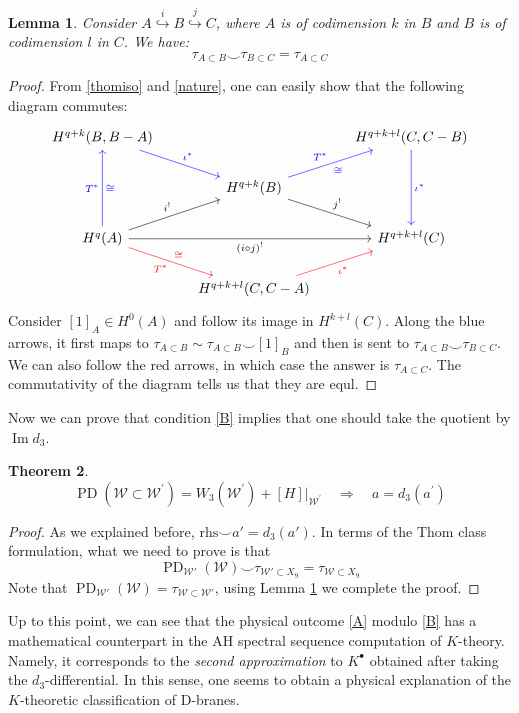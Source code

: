 \documentclass[a4paper,11pt]{article}
\newtheorem{theorem}{Theorem}[section]
\newtheorem{lemma}[theorem]{Lemma}
\theoremstyle{definition}
\theoremstyle{remark}
\begin{document}
\begin{lemma}
	\label{poor}
	Consider $A\overset{i}{\hookrightarrow}B\overset{j}{\hookrightarrow}C$, where $A$ is of codimension $k$ in $B$ and $B$ is of codimension $l$ in $C$. We have:
	\[
	\tau_{A\subset B}\smile \tau_{B\subset C}=\tau_{A\subset C}
	\]
\end{lemma}
\begin{proof}
From \eqref{thomiso} and \eqref{nature}, one can easily show that the following diagram commutes:
\[
\begin{tikzcd}
	{H^{q+k}(B,B-A)} && {H^{q+k+l}(C,C-B)} \\
	& {H^{q+k}(B)} \\
	{H^{q}(A)} && {H^{q+k+l}(C)} \\
	& {H^{q+k+l}(C,C-A)}
	\arrow[color=blue,"{\iota^*}", from=1-1, to=2-2]
	\arrow[color=blue,"{\iota^*}", from=1-3, to=3-3]
	\arrow[color=blue,"{T^*}","\cong"', from=2-2, to=1-3]
	\arrow["{j^!}", from=2-2, to=3-3]
	\arrow[color=blue,"{T^*}","\cong"', from=3-1, to=1-1]
	\arrow["{i^!}", from=3-1, to=2-2]
	\arrow["{(i\circ j)^!}"', from=3-1, to=3-3]
	\arrow[color=red,"{T^*}"',"\cong", from=3-1, to=4-2]
	\arrow[color=red,"{\iota^*}"', from=4-2, to=3-3]
\end{tikzcd}
\]
 Consider $[1]_A\in H^0(A)$ and follow its image in $H^{k+l}(C)$. Along the blue arrows, it first maps to $\tau_{A\subset B}\sim \tau_{A\subset B}\smile[1]_B$ and then is sent to $\tau_{A\subset B}\smile \tau_{B\subset C}$. We can also follow the red arrows, in which case the answer is $\tau_{A\subset C}$. The commutativity of the diagram tells us that they are equl. 
\end{proof}
Now we can prove that condition \eqref{B} implies that one should take the quotient by $\operatorname{Im}d_3$.
\begin{theorem}
	\[
	\operatorname{PD}\left(\mathcal{W}\subset\mathcal{W}^{\prime}\right)=W_3(\mathcal{W}^{\prime})+[H]|_{\mathcal{W}^{\prime}}\quad\Rightarrow\quad a=d_3(a^{\prime})
	\]
\end{theorem}
\begin{proof}
	As we explained before, $\mathrm{rhs}\smile a' =d_3(a')$. In terms of the Thom class formulation, what we need to prove is that
	\[
	\operatorname{PD}_{\mathcal{W}'}(\mathcal{W})\smile \tau_{\mathcal{W}'\subset X_9} =\tau_{\mathcal{W}\subset{X}_9}
	\]
	Note that $	\operatorname{PD}_{\mathcal{W}'}(\mathcal{W})=\tau_{\mathcal{W}\subset\mathcal{W}'}$, using Lemma \ref{poor} we complete the proof.
\end{proof}
Up to this point, we can see that the physical outcome \eqref{A} modulo \eqref{B} has a mathematical counterpart in the AH spectral sequence computation of $K$-theory. Namely, it corresponds to the {\itshape second approximation} to $K^\bullet$ obtained after taking the $d_3$-differential. In this sense, one seems to obtain a physical explanation of the $K$-theoretic classification of D-branes.
\end{document}
